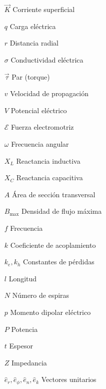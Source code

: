 \documentclass[10pt,conference]{IEEEtran}
\numberwithin{table}{section}
\begin{document}
\begin{itemize}[leftmargin=1.5cm]
    \item[$\vec{K}$] Corriente superficial
    \item[$q$] Carga eléctrica
    \item[$r$] Distancia radial
    \item[$\sigma$] Conductividad eléctrica
    \item[$\vec{\tau}$] Par (torque)
    \item[$v$] Velocidad de propagación
    \item[$V$] Potencial eléctrico
    \item[$\mathcal{E}$] Fuerza electromotriz
    \item[$\omega$] Frecuencia angular
    \item[$X_L$] Reactancia inductiva
    \item[$X_C$] Reactancia capacitiva
    \item[$A$] Área de sección transversal
    \item[$B_{\text{max}}$] Densidad de flujo máxima
    \item[$f$] Frecuencia
    \item[$k$] Coeficiente de acoplamiento
    \item[$k_e, k_h$] Constantes de pérdidas
    \item[$l$] Longitud
    \item[$N$] Número de espiras
    \item[$p$] Momento dipolar eléctrico
    \item[$P$] Potencia
    \item[$t$] Espesor
    \item[$Z$] Impedancia
    \item[$\hat{e}_r, \hat{e}_\phi, \hat{e}_n, \hat{e}_k$] Vectores unitarios
\end{itemize}
\end{document}
